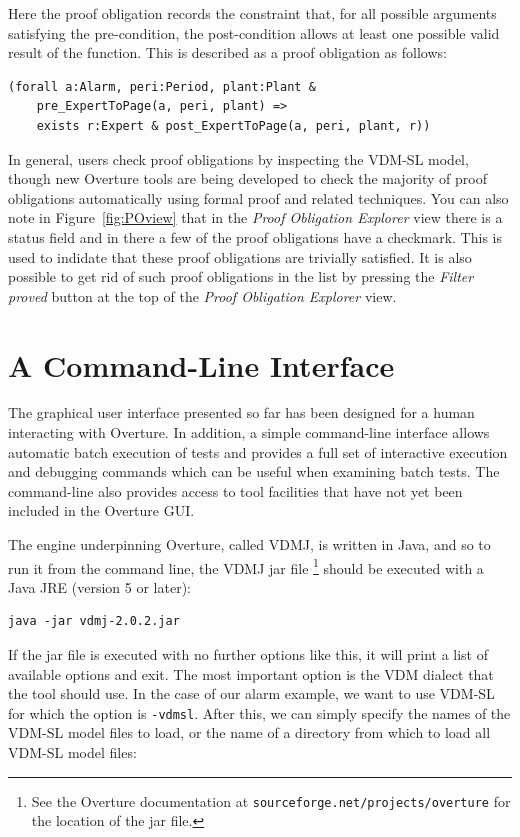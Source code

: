 Here the proof obligation records the constraint that, for all
possible arguments satisfying the pre-condition, the post-condition
allows at least one possible valid result of the function. This is
described as a proof obligation as follows:

\begin{lstlisting}
(forall a:Alarm, peri:Period, plant:Plant &
    pre_ExpertToPage(a, peri, plant) => 
    exists r:Expert & post_ExpertToPage(a, peri, plant, r))
\end{lstlisting}

In general, users check proof obligations by inspecting the VDM-SL model,
though new Overture tools are being developed to check the majority of
proof obligations automatically using formal proof and related
techniques. You can also note in Figure~\ref{fig:POview} that in the
\emph{Proof Obligation Explorer} view there is a status field and in there
a few of the proof obligations have a checkmark. This is used to
indidate that these proof obligations are trivially satisfied. It is
also possible to get rid of such proof obligations in the list by
pressing the \emph{Filter proved} button at the top of the \emph{Proof
  Obligation Explorer} view.

\section{A Command-Line Interface}\label{sec:cmdline}

The graphical user interface presented so far has been designed for a
human interacting with Overture. In addition, a simple command-line
interface allows automatic batch execution of tests and provides a
full set of interactive execution and debugging commands which can be
useful when examining batch tests. The command-line also provides
access to tool facilities that have not yet been included in the
Overture GUI.

The engine underpinning Overture, called VDMJ, is written in Java, and
so to run it from the command line, the VDMJ jar file \footnote{See
  the Overture documentation at
  \texttt{sourceforge.net/projects/overture} for the location of the
  jar file.}  should be executed with a Java JRE (version 5 or later):

\lstset{style=tool,language=}
\begin{lstlisting}
java -jar vdmj-2.0.2.jar
\end{lstlisting}

\noindent If the jar file is executed with no further options like
this, it will print a list of available options and exit. The most
important option is the VDM dialect that the tool should use. In the
case of our alarm example, we want to use VDM-SL for which the option
is \verb|-vdmsl|. After this, we can simply specify the names of the
VDM-SL model files to load, or the name of a directory from which to
load all VDM-SL model files:

